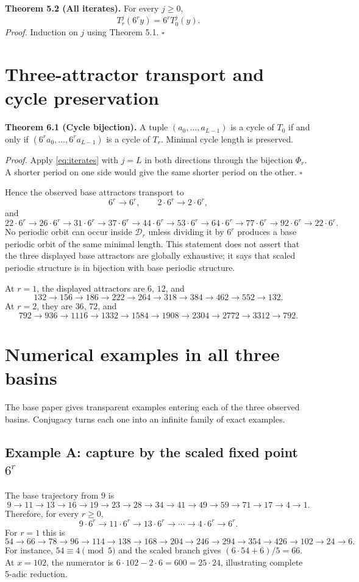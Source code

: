 \documentclass[11pt]{article}
\begin{document}
\textbf{Theorem 5.2 (All iterates).} For every $j\ge0$,
\begin{equation}T_r^j(6^r y)=6^rT_0^j(y).\label{eq:iterates}\end{equation}
\textit{Proof.} Induction on $j$ using Theorem 5.1. \hfill$\square$

\section{Three-attractor transport and cycle preservation}
\textbf{Theorem 6.1 (Cycle bijection).} A tuple $(a_0,\ldots,a_{L-1})$ is a cycle of $T_0$ if and only if $(6^r a_0,\ldots,6^r a_{L-1})$ is a cycle of $T_r$. Minimal cycle length is preserved.

\textit{Proof.} Apply \eqref{eq:iterates} with $j=L$ in both directions through the bijection $\Phi_r$. A shorter period on one side would give the same shorter period on the other. \hfill$\square$

Hence the observed base attractors transport to
\begin{equation}6^r\to6^r,\qquad2\cdot6^r\to2\cdot6^r,\label{eq:fixedscaled}\end{equation}
and
\begin{equation}
22\cdot6^r\to26\cdot6^r\to31\cdot6^r\to37\cdot6^r\to44\cdot6^r\to53\cdot6^r\to64\cdot6^r\to77\cdot6^r\to92\cdot6^r\to22\cdot6^r.\label{eq:scaledcycle}
\end{equation}
No periodic orbit can occur inside $\mathcal D_r$ unless dividing it by $6^r$ produces a base periodic orbit of the same minimal length. This statement does not assert that the three displayed base attractors are globally exhaustive; it says that scaled periodic structure is in bijection with base periodic structure.

At $r=1$, the displayed attractors are $6$, $12$, and
\[
132\to156\to186\to222\to264\to318\to384\to462\to552\to132.
\]
At $r=2$, they are $36$, $72$, and
\[
792\to936\to1116\to1332\to1584\to1908\to2304\to2772\to3312\to792.
\]

\section{Numerical examples in all three basins}
The base paper gives transparent examples entering each of the three observed basins. Conjugacy turns each one into an infinite family of exact examples.

\subsection*{Example A: capture by the scaled fixed point $6^r$}
The base trajectory from $9$ is
\[
9\to11\to13\to16\to19\to23\to28\to34\to41\to49\to59\to71\to17\to4\to1.
\]
Therefore, for every $r\ge0$,
\[
9\cdot6^r\to11\cdot6^r\to13\cdot6^r\to\cdots\to4\cdot6^r\to6^r.
\]
For $r=1$ this is
\[
54\to66\to78\to96\to114\to138\to168\to204\to246\to294\to354\to426\to102\to24\to6.
\]
For instance, $54\equiv4\pmod5$ and the scaled branch gives $(6\cdot54+6)/5=66$. At $x=102$, the numerator is $6\cdot102-2\cdot6=600=25\cdot24$, illustrating complete 5-adic reduction.
\end{document}
